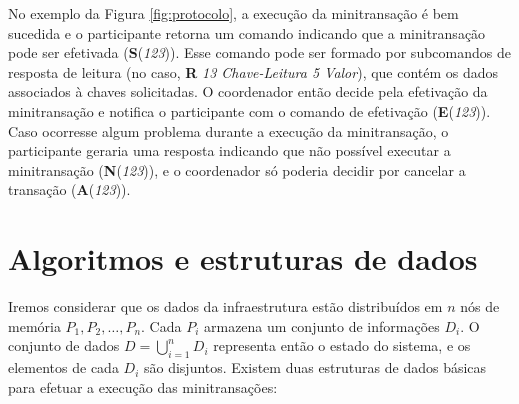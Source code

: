 \documentclass[11pt,twoside,a4paper]{book}
\begin{document}
No exemplo da Figura \ref{fig:protocolo}, a execução da minitransação é bem sucedida e o participante retorna um comando indicando que a minitransação pode ser efetivada (\textbf{S}(\textit{123})). Esse comando pode ser formado por subcomandos de resposta de leitura (no caso, \textbf{R} \textit{13 Chave-Leitura 5 Valor}), que contém os dados associados à chaves solicitadas. O coordenador então decide pela efetivação da minitransação e notifica o participante com o comando de efetivação (\textbf{E}(\textit{123})). Caso ocorresse algum problema durante a execução da minitransação, o participante geraria uma resposta indicando que não possível executar a minitransação (\textbf{N}(\textit{123})), e o coordenador só poderia decidir por cancelar a transação (\textbf{A}(\textit{123})).


\section{Algoritmos e estruturas de dados}
\label{sec:algoritmos}

Iremos considerar que os dados da infraestrutura estão distribuídos em $n$ nós de memória $P_1, P_2, \dotsc, P_n$. Cada $P_i$ armazena um conjunto de informações $D_i$. O conjunto de dados $D = \bigcup_{i=1}^n D_i$ representa então o estado do sistema, e os elementos de cada $D_i$ são disjuntos. Existem duas estruturas de dados básicas para efetuar a execução das minitransações:

\end{document}
